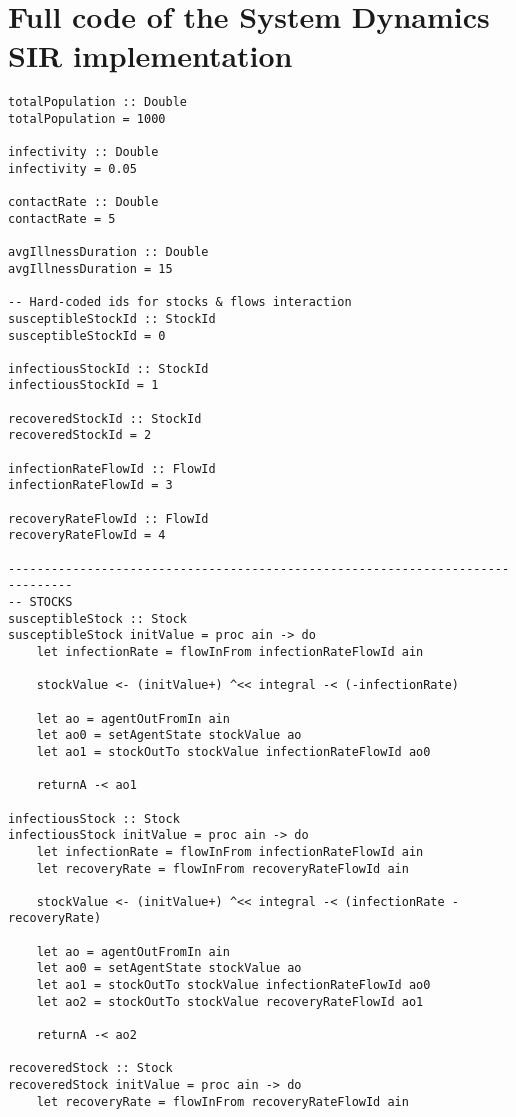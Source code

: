 \section{Full code of the System Dynamics SIR implementation}
\label{app:sd_code}

\begin{verbatim}
totalPopulation :: Double
totalPopulation = 1000

infectivity :: Double
infectivity = 0.05

contactRate :: Double
contactRate = 5

avgIllnessDuration :: Double
avgIllnessDuration = 15

-- Hard-coded ids for stocks & flows interaction
susceptibleStockId :: StockId
susceptibleStockId = 0

infectiousStockId :: StockId
infectiousStockId = 1

recoveredStockId :: StockId
recoveredStockId = 2

infectionRateFlowId :: FlowId
infectionRateFlowId = 3

recoveryRateFlowId :: FlowId
recoveryRateFlowId = 4

-------------------------------------------------------------------------------
-- STOCKS
susceptibleStock :: Stock
susceptibleStock initValue = proc ain -> do
    let infectionRate = flowInFrom infectionRateFlowId ain

    stockValue <- (initValue+) ^<< integral -< (-infectionRate)
    
    let ao = agentOutFromIn ain
    let ao0 = setAgentState stockValue ao
    let ao1 = stockOutTo stockValue infectionRateFlowId ao0

    returnA -< ao1

infectiousStock :: Stock
infectiousStock initValue = proc ain -> do
    let infectionRate = flowInFrom infectionRateFlowId ain
    let recoveryRate = flowInFrom recoveryRateFlowId ain

    stockValue <- (initValue+) ^<< integral -< (infectionRate - recoveryRate)
    
    let ao = agentOutFromIn ain
    let ao0 = setAgentState stockValue ao
    let ao1 = stockOutTo stockValue infectionRateFlowId ao0 
    let ao2 = stockOutTo stockValue recoveryRateFlowId ao1
    
    returnA -< ao2

recoveredStock :: Stock
recoveredStock initValue = proc ain -> do
    let recoveryRate = flowInFrom recoveryRateFlowId ain


\end{verbatim}
